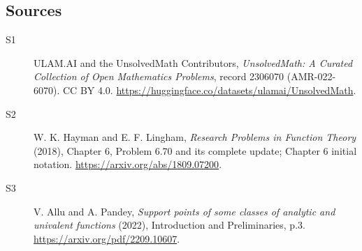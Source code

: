 \documentclass[11pt]{article}
\begin{document}
\subsection{Sources}
\begin{description}
\item[\hypertarget{source:2306070:1}{S1}] ULAM.AI and the UnsolvedMath Contributors, \emph{UnsolvedMath: A Curated Collection of Open Mathematics Problems}, record 2306070 (AMR-022-6070). CC BY 4.0. \url{https://huggingface.co/datasets/ulamai/UnsolvedMath}.
\item[\hypertarget{source:2306070:2}{S2}] W. K. Hayman and E. F. Lingham, \emph{Research Problems in Function Theory} (2018), Chapter 6, Problem 6.70 and its complete update; Chapter 6 initial notation. \url{https://arxiv.org/abs/1809.07200}.
\item[\hypertarget{source:2306070:3}{S3}] V. Allu and A. Pandey, \emph{Support points of some classes of analytic and univalent functions} (2022), Introduction and Preliminaries, p.3. \url{https://arxiv.org/pdf/2209.10607}.
\end{description}
\label{end:2306070}
\end{document}
